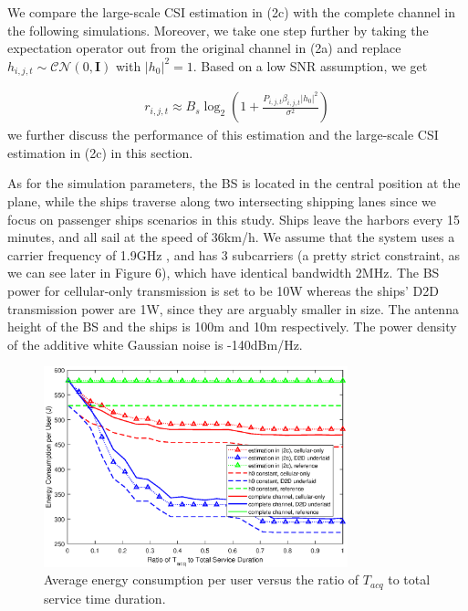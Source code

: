 \documentclass{ieeeaccess}
\begin{document}
We compare the large-scale CSI estimation in (2c) with the complete channel in the following simulations. Moreover, we take one step further by taking the expectation operator out from the original channel in (2a) and replace ${h_{i,j,t}} \sim \mathcal{CN}(0, \mathbf{I})$ with ${\left| {{h_0}} \right|^2} = 1$. Based on a low SNR assumption, we get 

\begin{align}
{r_{i,j,t}} \approx {B_s}{\log _2}\left( {1 + \frac{{{P_{i,j,t}}{\beta _{i,j,t}}{{\left| {{h_0}} \right|}^2}}}{{{\sigma ^2}}}} \right)
\end{align}
we further discuss the performance of this estimation and the large-scale CSI estimation in (2c) in this section.

As for the simulation parameters, the BS is located in the central position at the plane, while the ships traverse along two intersecting shipping lanes since we focus on passenger ships scenarios in this study. 
Ships leave the harbors every 15 minutes, and all sail at the speed of 36km/h. We assume that the system uses a carrier frequency of 1.9GHz , and has 3 subcarriers (a pretty strict constraint, as we can see later in Figure 6), which have identical bandwidth 2MHz. The BS power for cellular-only transmission is set to be 10W whereas the ships' D2D transmission power are 1W, since they are arguably smaller in size. The antenna height of the BS and the ships is 100m and 10m respectively. The power density of the additive white Gaussian noise is -140dBm/Hz.





\begin{figure} [htb]
\includegraphics*[width=8.8cm]{Tranges.eps}
\caption{Average energy consumption per user versus the ratio of ${T_{acq}}$ to total service time duration.} \label{fig:4}
\end{figure}
\end{document}
